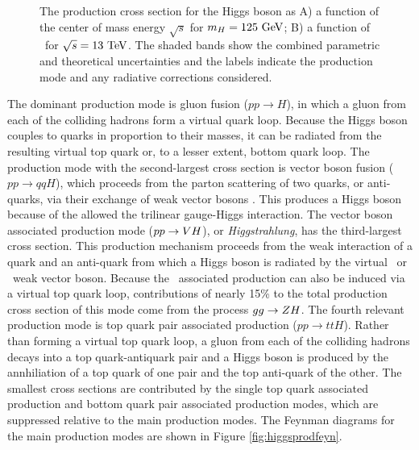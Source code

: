 \begin{figure}[htbp]
{  }
  \caption[Higgs Boson Production Cross Sections]{The production cross section for the Higgs boson as A) a function of the center of mass energy $\sqrt{s}$ for $m_{H} = 125\ \mathrm{GeV}$; B) a function of \massH\ for $\sqrt{s} = 13\ \mathrm{TeV}$. The shaded bands show the combined parametric and theoretical uncertainties and the labels indicate the production mode and any radiative corrections considered.\cite{CERNYR4}}
  \label{fig:higgsprodxsec}
\end{figure}

The dominant production mode is gluon fusion ($pp \rightarrow H$), in which a gluon from each of the colliding hadrons form a virtual quark loop. Because the Higgs boson couples to quarks in proportion to their masses, it can be radiated from the resulting virtual top quark or, to a lesser extent, bottom quark loop. The production mode with the second-largest cross section is vector boson fusion ($pp \rightarrow qqH$), which proceeds from the parton scattering of two quarks, or anti-quarks, via their exchange of weak vector bosons \bosV. This produces a Higgs boson because of the allowed the trilinear gauge-Higgs interaction. The vector boson associated production mode ($pp \rightarrow VH$), or \textit{Higgstrahlung}, has the third-largest cross section. This production mechanism proceeds from the weak interaction of a quark and an anti-quark from which a Higgs boson is radiated by the virtual \bosW\ or \bosZ\ weak vector boson. Because the \bosZ\ associated production can also be induced via a virtual top quark loop, contributions of nearly 15\% to the total production cross section of this mode come from the process $gg \rightarrow ZH$. The fourth relevant production mode is top quark pair associated production ($pp \rightarrow ttH$). Rather than forming a virtual top quark loop, a gluon from each of the colliding hadrons decays into a top quark-antiquark pair and a Higgs boson is produced by the annhiliation of a top quark of one pair and the top anti-quark of the other. The smallest cross sections are contributed by the single top quark associated production and bottom quark pair associated production modes, which are suppressed relative to the main production modes. The Feynman diagrams for the main production modes are shown in Figure \ref{fig:higgsprodfeyn}.


